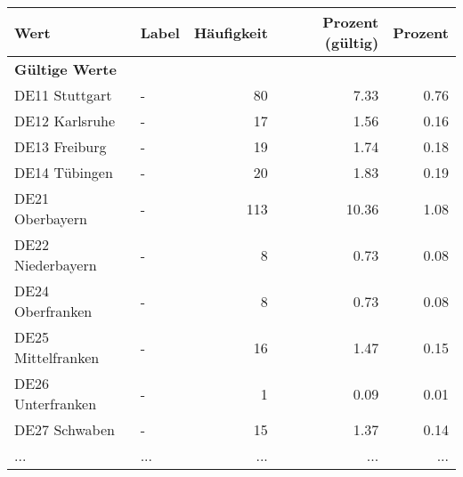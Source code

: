      \begin{longtable}{Xlrrr}
     \toprule
     \textbf{Wert} & \textbf{Label} & \textbf{Häufigkeit} & \textbf{Prozent (gültig)} & \textbf{Prozent} \\
     \endhead
     \midrule
     \multicolumn{5}{l}{\textbf{Gültige Werte}}\\
        \multicolumn{1}{X}{DE11 Stuttgart} & - & \num{80} & \num[round-mode=places,round-precision=2]{7.33} & \num[round-mode=places,round-precision=2]{0.76} \\
        \multicolumn{1}{X}{DE12 Karlsruhe} & - & \num{17} & \num[round-mode=places,round-precision=2]{1.56} & \num[round-mode=places,round-precision=2]{0.16} \\
        \multicolumn{1}{X}{DE13 Freiburg} & - & \num{19} & \num[round-mode=places,round-precision=2]{1.74} & \num[round-mode=places,round-precision=2]{0.18} \\
        \multicolumn{1}{X}{DE14 Tübingen} & - & \num{20} & \num[round-mode=places,round-precision=2]{1.83} & \num[round-mode=places,round-precision=2]{0.19} \\
        \multicolumn{1}{X}{DE21 Oberbayern} & - & \num{113} & \num[round-mode=places,round-precision=2]{10.36} & \num[round-mode=places,round-precision=2]{1.08} \\
        \multicolumn{1}{X}{DE22 Niederbayern} & - & \num{8} & \num[round-mode=places,round-precision=2]{0.73} & \num[round-mode=places,round-precision=2]{0.08} \\
        \multicolumn{1}{X}{DE24 Oberfranken} & - & \num{8} & \num[round-mode=places,round-precision=2]{0.73} & \num[round-mode=places,round-precision=2]{0.08} \\
        \multicolumn{1}{X}{DE25 Mittelfranken} & - & \num{16} & \num[round-mode=places,round-precision=2]{1.47} & \num[round-mode=places,round-precision=2]{0.15} \\
        \multicolumn{1}{X}{DE26 Unterfranken} & - & \num{1} & \num[round-mode=places,round-precision=2]{0.09} & \num[round-mode=places,round-precision=2]{0.01} \\
        \multicolumn{1}{X}{DE27 Schwaben} & - & \num{15} & \num[round-mode=places,round-precision=2]{1.37} & \num[round-mode=places,round-precision=2]{0.14} \\
       ... & ... & ... & ... & ... \\

\end{longtable}
